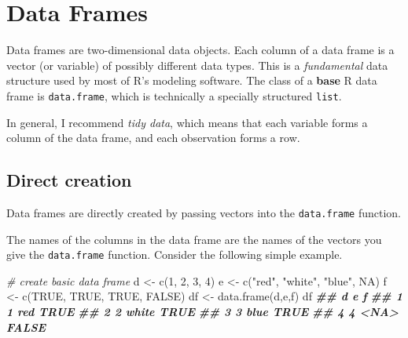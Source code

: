 \documentclass[
]{book}
\newenvironment{Shaded}{\begin{snugshade}}{\end{snugshade}}
\newcommand{\CommentTok}[1]{\textcolor[rgb]{0.56,0.35,0.01}{\textit{#1}}}
\newcommand{\ConstantTok}[1]{\textcolor[rgb]{0.00,0.00,0.00}{#1}}
\newcommand{\DecValTok}[1]{\textcolor[rgb]{0.00,0.00,0.81}{#1}}
\newcommand{\DocumentationTok}[1]{\textcolor[rgb]{0.56,0.35,0.01}{\textbf{\textit{#1}}}}
\newcommand{\FunctionTok}[1]{\textcolor[rgb]{0.00,0.00,0.00}{#1}}
\newcommand{\NormalTok}[1]{#1}
\newcommand{\OtherTok}[1]{\textcolor[rgb]{0.56,0.35,0.01}{#1}}
\newcommand{\StringTok}[1]{\textcolor[rgb]{0.31,0.60,0.02}{#1}}
\theoremstyle{definition}
\theoremstyle{definition}
\theoremstyle{definition}
\theoremstyle{definition}
\theoremstyle{remark}
\begin{document}
\hypertarget{data-frames}{%
\section{Data Frames}\label{data-frames}}

Data frames are two-dimensional data objects. Each column of a data frame is a vector (or variable) of possibly different data types. This is a \emph{fundamental} data structure used by most of R's modeling software. The class of a \textbf{base} R data frame is \texttt{data.frame}, which is technically a specially structured \texttt{list}.

In general, I recommend \emph{tidy data}, which means that each variable forms a column of the data frame, and each observation forms a row.

\hypertarget{direct-creation}{%
\subsection{Direct creation}\label{direct-creation}}

Data frames are directly created by passing vectors into the \texttt{data.frame} function.

The names of the columns in the data frame are the names of the vectors you give the \texttt{data.frame} function. Consider the following simple example.

\begin{Shaded}
\begin{Highlighting}[]
\CommentTok{\# create basic data frame}
\NormalTok{d }\OtherTok{\textless{}{-}} \FunctionTok{c}\NormalTok{(}\DecValTok{1}\NormalTok{, }\DecValTok{2}\NormalTok{, }\DecValTok{3}\NormalTok{, }\DecValTok{4}\NormalTok{)}
\NormalTok{e }\OtherTok{\textless{}{-}} \FunctionTok{c}\NormalTok{(}\StringTok{"red"}\NormalTok{, }\StringTok{"white"}\NormalTok{, }\StringTok{"blue"}\NormalTok{, }\ConstantTok{NA}\NormalTok{)}
\NormalTok{f }\OtherTok{\textless{}{-}} \FunctionTok{c}\NormalTok{(}\ConstantTok{TRUE}\NormalTok{, }\ConstantTok{TRUE}\NormalTok{, }\ConstantTok{TRUE}\NormalTok{, }\ConstantTok{FALSE}\NormalTok{)}
\NormalTok{df }\OtherTok{\textless{}{-}} \FunctionTok{data.frame}\NormalTok{(d,e,f)}
\NormalTok{df}
\DocumentationTok{\#\#   d     e     f}
\DocumentationTok{\#\# 1 1   red  TRUE}
\DocumentationTok{\#\# 2 2 white  TRUE}
\DocumentationTok{\#\# 3 3  blue  TRUE}
\DocumentationTok{\#\# 4 4  \textless{}NA\textgreater{} FALSE}
\end{Highlighting}
\end{Shaded}
\end{document}
